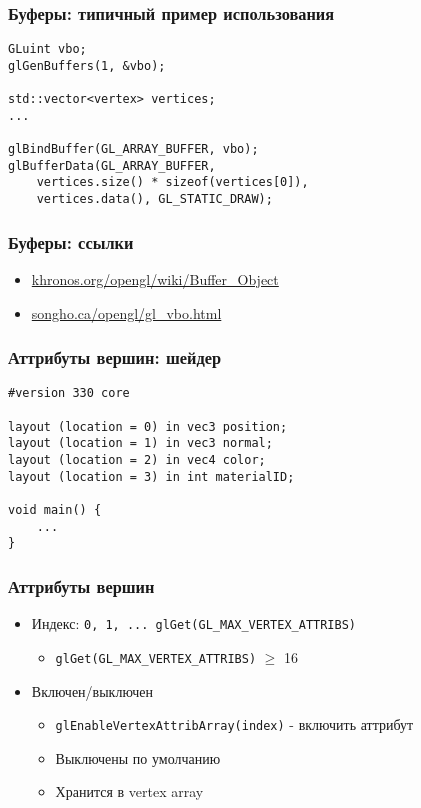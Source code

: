 \documentclass{beamer}
\begin{document}
\begin{frame}[fragile]
\frametitle{Буферы: типичный пример использования}
\begin{verbatim}
GLuint vbo;
glGenBuffers(1, &vbo);

std::vector<vertex> vertices;
...

glBindBuffer(GL_ARRAY_BUFFER, vbo);
glBufferData(GL_ARRAY_BUFFER,
    vertices.size() * sizeof(vertices[0]),
    vertices.data(), GL_STATIC_DRAW);
\end{verbatim}
\end{frame}

\begin{frame}[fragile]
\frametitle{Буферы: ссылки}
\begin{itemize}
\item \href{https://www.khronos.org/opengl/wiki/Buffer_Object}{khronos.org/opengl/wiki/Buffer\_Object}
\item \href{https://www.songho.ca/opengl/gl_vbo.html}{songho.ca/opengl/gl\_vbo.html}
\end{itemize}
\end{frame}

\begin{frame}[fragile]
\frametitle{Аттрибуты вершин: шейдер}
\begin{verbatim}
#version 330 core

layout (location = 0) in vec3 position;
layout (location = 1) in vec3 normal;
layout (location = 2) in vec4 color;
layout (location = 3) in int materialID;

void main() {
    ...
}
\end{verbatim}
\end{frame}

\begin{frame}[fragile]
\frametitle{Аттрибуты вершин}
\begin{itemize}
\item Индекс: \verb|0, 1, ... glGet(GL_MAX_VERTEX_ATTRIBS)|
\begin{itemize}
\item \verb|glGet(GL_MAX_VERTEX_ATTRIBS)| \begin{math}\geq\end{math} 16
\end{itemize}
\pause
\item Включен/выключен
\begin{itemize}
\item \verb|glEnableVertexAttribArray(index)| - включить аттрибут
\item Выключены по умолчанию
\item Хранится в vertex array
\end{itemize}
\end{itemize}
\end{frame}
\end{document}
